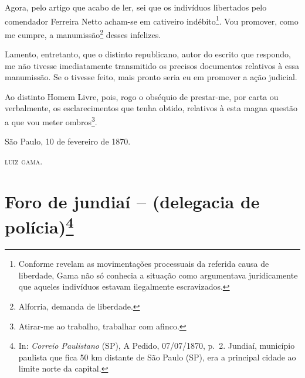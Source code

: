Agora, pelo artigo que acabo de ler, sei que os indivíduos libertados
pelo comendador Ferreira Netto acham-se em cativeiro
indébito\footnote{ Conforme revelam as movimentações processuais da
  referida causa de liberdade, Gama não só conhecia a situação como
  argumentava juridicamente que aqueles indivíduos estavam ilegalmente
  escravizados.}. Vou promover, como me cumpre, a manumissão\footnote{
  Alforria, demanda de liberdade.} desses infelizes.

Lamento, entretanto, que o distinto republicano, autor do escrito que
respondo, me não tivesse imediatamente transmitido os precisos
documentos relativos à essa manumissão. Se o tivesse feito, mais pronto
seria eu em promover a ação judicial.

Ao distinto Homem Livre, pois, rogo o obséquio de prestar-me, por carta
ou verbalmente, os esclarecimentos que tenha obtido, relativos à esta
magna questão a que vou meter ombros\footnote{ Atirar-me ao trabalho,
  trabalhar com afinco.}.
\begin{flushright}
São Paulo, 10 de fevereiro de 1870.

\textsc{luiz gama}.
\end{flushright}
\chapter{Foro de jundiaí -- (delegacia de polícia)\footnote{ In: \emph{Correio Paulistano} (SP), A Pedido, 07/07/1870,
  p.~2. Jundiaí, município paulista que fica 50 km distante de São Paulo
  (SP), era a principal cidade ao limite norte da capital.}} %


